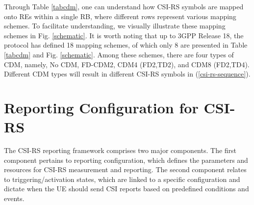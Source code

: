 \documentclass[lettersize,journal]{IEEEtran}
\begin{document}
\begin{appendices}



Through Table \ref{tabcdm}, one can understand how CSI-RS symbols are mapped onto REs within a single RB, where different rows represent various mapping schemes. To facilitate understanding, we visually illustrate these mapping schemes in Fig. \ref{schematic}. It is worth noting that up to 3GPP Release 18, the protocol has defined 18 mapping schemes, of which only 8 are presented in Table \ref{tabcdm} and Fig. \ref{schematic}. Among these schemes, there are four types of CDM, namely, No CDM, FD-CDM2, CDM4 (FD2,TD2), and CDM8 (FD2,TD4). Different CDM types will result in different CSI-RS symbols in (\ref{csi-rs-sequence}).





\section{Reporting Configuration for CSI-RS}\label{reporting}
The CSI-RS reporting framework comprises two major components. The first component pertains to reporting configuration, which defines the parameters and resources for CSI-RS measurement and reporting. The second component relates to triggering/activation states, which are linked to a specific configuration and dictate when the UE should send CSI reports based on predefined conditions and events.






\end{appendices}
\end{document}
